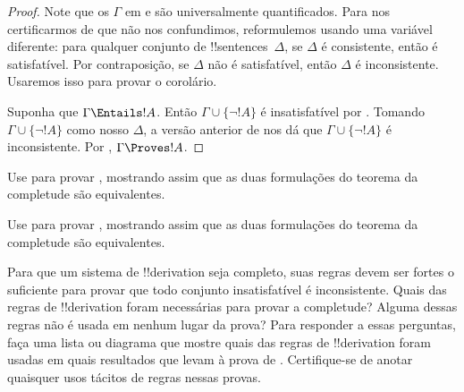 \documentclass[../../../include/open-logic-section]{subfiles}
\begin{document}
\begin{proof}
Note que os $\Gamma$ em  e
 são universalmente quantificados.  Para nos
certificarmos de que não nos confundimos, reformulemos 
usando uma variável diferente: para qualquer conjunto de !!{sentence}s~$\Delta$, se
$\Delta$ é consistente, então é satisfatível.  Por contraposição, se
$\Delta$ não é satisfatível, então $\Delta$ é inconsistente.  Usaremos
isso para provar o corolário.

Suponha que $\Gamma \Entails !A$.  Então $\Gamma \cup \{\lnot !A\}$ é
insatisfatível por .  Tomando $\Gamma
\cup \{\lnot !A\}$ como nosso $\Delta$, a versão anterior de
 nos dá que $\Gamma \cup \{\lnot !A\}$ é
inconsistente.  Por
,
$\Gamma \Proves !A$.
\end{proof}

\begin{prob}
Use  para provar
, mostrando assim que as duas
formulações do teorema da completude são equivalentes.
\end{prob}
\tagendprob

\begin{prob}
Use  para provar
, mostrando assim que as duas
formulações do teorema da completude são equivalentes.
\end{prob}
\tagendprob

\begin{prob}
Para que um sistema de !!{derivation} seja completo, suas regras devem ser
fortes o suficiente para provar que todo conjunto insatisfatível é inconsistente.  Quais das
regras de !!{derivation} foram necessárias para provar a completude?  Alguma
dessas regras não é usada em nenhum lugar da prova?  Para responder
a essas perguntas, faça uma lista ou diagrama que mostre quais das regras
de !!{derivation} foram usadas em quais resultados que levam à prova de
.  Certifique-se de anotar quaisquer
usos tácitos de regras nessas provas.
\end{prob}
\tagendprob
\end{document}
